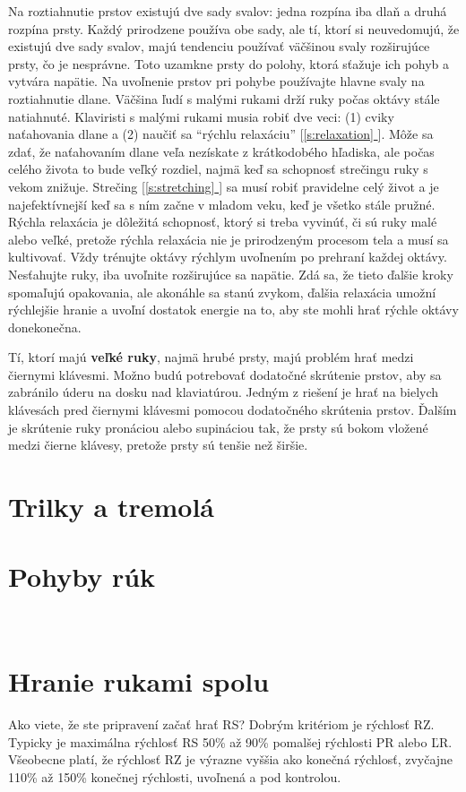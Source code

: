 \documentclass[11pt,a4paper]{book}
\newcommand*{\fullref}[1]{\hyperref[{#1}]{\ref*{#1} \nameref*{#1}}} %
\newcommand*{\fullrefp}[1]{[\fullref{#1}]} %
\begin{document}
Na roztiahnutie prstov existujú dve sady svalov: jedna rozpína ​​iba dlaň a druhá rozpína ​​prsty. Každý prirodzene používa obe sady, ale tí, ktorí si neuvedomujú, že existujú dve sady svalov, majú tendenciu používať väčšinou svaly rozširujúce prsty, čo je nesprávne. Toto uzamkne prsty do polohy, ktorá sťažuje ich pohyb a vytvára napätie. Na uvoľnenie prstov pri pohybe používajte hlavne svaly na roztiahnutie dlane. Väčšina ľudí s malými rukami drží ruky počas oktávy stále natiahnuté. Klaviristi s malými rukami musia robiť dve veci: (1) cviky naťahovania dlane a (2) naučiť sa “rýchlu relaxáciu” \fullrefp{s:relaxation}. Môže sa zdať, že naťahovaním dlane veľa nezískate z krátkodobého hľadiska, ale počas celého života to bude veľký rozdiel, najmä keď sa schopnosť strečingu ruky s vekom znižuje. Strečing \fullrefp{s:stretching} sa musí robiť pravidelne celý život a je najefektívnejší keď sa s ním začne v mladom veku, keď je všetko stále pružné. Rýchla relaxácia je dôležitá schopnosť, ktorý si treba vyvinúť, či sú ruky malé alebo veľké, pretože rýchla relaxácia nie je prirodzeným procesom tela a musí sa kultivovať. Vždy trénujte oktávy rýchlym uvoľnením po prehraní každej oktávy. Nesťahujte ruky, iba uvoľnite rozširujúce sa napätie. Zdá sa, že tieto ďalšie kroky spomaľujú opakovania, ale akonáhle sa stanú zvykom, ďalšia relaxácia umožní rýchlejšie hranie a uvoľní dostatok energie na to, aby ste mohli hrať rýchle oktávy donekonečna.

Tí, ktorí majú \textbf{veľké ruky}, najmä hrubé prsty, majú problém hrať medzi čiernymi klávesmi. Možno budú potrebovať dodatočné skrútenie prstov, aby sa zabránilo úderu na dosku nad klaviatúrou. Jedným z riešení je hrať na bielych klávesách pred čiernymi klávesmi pomocou dodatočného skrútenia prstov. Ďalším je skrútenie ruky pronáciou alebo supináciou tak, že prsty sú bokom vložené medzi čierne klávesy, pretože prsty sú tenšie než širšie.

\section{Trilky a tremolá}\label{s:trills-tremolos}

\section{Pohyby rúk}\label{s:hand-motions}
\ 
\section{Hranie rukami spolu}\label{s:hands-together}
Ako viete, že ste pripravení začať hrať RS? Dobrým kritériom je rýchlosť RZ. Typicky je maximálna rýchlosť RS 50\% až 90\% pomalšej rýchlosti PR alebo ĽR. Všeobecne platí, že rýchlosť RZ je výrazne vyššia ako konečná rýchlosť, zvyčajne 110\% až 150\% konečnej rýchlosti, uvoľnená a pod kontrolou.
\end{document}
